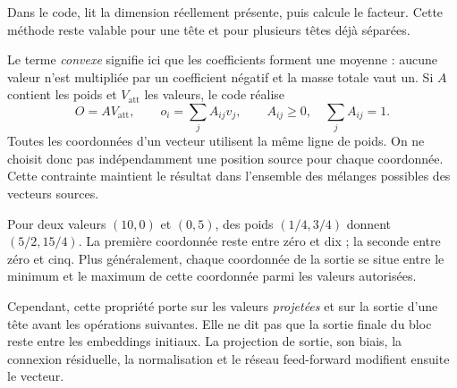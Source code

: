 Dans le code,  lit la dimension réellement présente, puis  calcule le facteur. Cette méthode reste valable pour une tête et pour plusieurs têtes déjà séparées.






Le terme \emph{convexe} signifie ici que les coefficients forment une moyenne : aucune valeur n'est multipliée par un coefficient négatif et la masse totale vaut un. Si $A$ contient les poids et $V_{\mathrm{att}}$ les valeurs, le code réalise
\[
 O=AV_{\mathrm{att}},\qquad
 o_i=\sum_j A_{ij}v_j,\qquad
 A_{ij}\geq0,\quad \sum_j A_{ij}=1.
\]
Toutes les coordonnées d'un vecteur utilisent la même ligne de poids. On ne choisit donc pas indépendamment une position source pour chaque coordonnée. Cette contrainte maintient le résultat dans l'ensemble des mélanges possibles des vecteurs sources.

Pour deux valeurs $(10,0)$ et $(0,5)$, des poids $(1/4,3/4)$ donnent $(5/2,15/4)$. La première coordonnée reste entre zéro et dix ; la seconde entre zéro et cinq. Plus généralement, chaque coordonnée de la sortie se situe entre le minimum et le maximum de cette coordonnée parmi les valeurs autorisées.

Cependant, cette propriété porte sur les valeurs \emph{projetées} et sur la sortie d'une tête avant les opérations suivantes. Elle ne dit pas que la sortie finale du bloc reste entre les embeddings initiaux. La projection de sortie, son biais, la connexion résiduelle, la normalisation et le réseau feed-forward modifient ensuite le vecteur.

